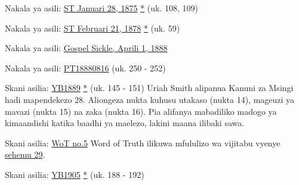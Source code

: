 Nakala ya asili: \href{https://documents.adventistarchives.org/Periodicals/ST/ST18750128-V01-14.pdf#search=ST18750128}{ST Januari 28, 1875} \href{https://forgotten-pillar.s3.us-east-2.amazonaws.com/ST18750128-V01-14.pdf}{*} (uk. 108, 109)


Nakala ya asili: \href{https://documents.adventistarchives.org/Periodicals/ST/ST18780221-V04-08.pdf#search=%22As%20already%20stated%2C%20S%2E%20D%2E%20Adventists%22}{ST Februari 21, 1878} \href{https://forgotten-pillar.s3.us-east-2.amazonaws.com/ST18780221-V04-08.pdf}{*} (uk. 59)


Nakala ya asili: \href{https://adventistdigitallibrary.org/adl-410336/gospel-sickle-april-1-1888?view_only=true&solr_nav%5Bid%5D=ff4d7f3f77b9bdf9e9ac&solr_nav%5Bpage%5D=0&solr_nav%5Boffset%5D=6}{Gospel Sickle, Aprili 1, 1888}


Nakala ya asili: \href{https://adventistdigitallibrary.org/adl-402854/present-truth-august-16-1888?view_only=true&solr_nav%5Bid%5D=ff4d7f3f77b9bdf9e9ac&solr_nav%5Bpage%5D=0&solr_nav%5Boffset%5D=13}{PT18880816} (uk. 250 - 252)


Skani asilia: \href{https://documents.adventistarchives.org/Yearbooks/YB1889.pdf#search=Yearbook%201889}{YB1889} \href{https://forgotten-pillar.s3.us-east-2.amazonaws.com/YB1889.pdf}{*} (uk. 145 - 151) Uriah Smith alipanua Kanuni za Msingi hadi mapendekezo 28. Aliongeza nukta kuhusu utakaso (nukta 14), mageuzi ya mavazi (nukta 15) na zaka (nukta 16). Pia alifanya mabadiliko madogo ya kimaandishi katika baadhi ya maelezo, lakini maana ilibaki sawa.


Skani asilia: \href{https://adl.b2.adventistdigitallibrary.org/concern/published_works/4ffda25e-a06b-48d4-8ace-67cdcd33726f}{WoT no.5}
Word of Truth ilikuwa mfululizo wa vijitabu vyenye \href{https://adl.b2.adventistdigitallibrary.org/concern/parent/22267078_fundamental_principles_of_seventh_day_adventists/published_works/94a22141-33e8-4b9a-b397-2fe48c17bec4}{sehemu 29}.


Skani asilia: \href{https://documents.adventistarchives.org/Yearbooks/YB1905.pdf#search=Yearbook%201905}{YB1905} \href{https://forgotten-pillar.s3.us-east-2.amazonaws.com/YB1905.pdf}{*} (uk. 188 - 192)

